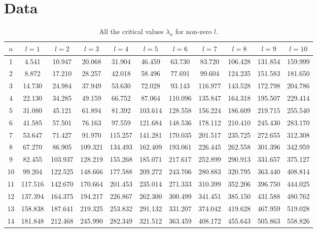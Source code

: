\documentclass[12pt,twoside]{reedthesis}
\begin{document}
\chapter{Data}
\begin{table}[h]
\begin{adjustwidth}{-0.5in}{-0.5in}
	\caption{All the critical values $\lambda_n$ for non-zero $l$.}
	\label{tab:alldata}
	\begin{tabular}{c|cccccccccc}
		$n$	& $l = 1$	& $l = 2$	& $l = 3$	& $l = 4$	& $l = 5$	& $l = 6$	& $l = 7$	& $l = 8$	& $l = 9$	& $l = 10$\\
		\hline
		1	& 4.541	& 10.947	& 20.068	& 31.904	& 46.459	& 63.730	& 83.720	& 106.428	& 131.854	& 159.999\\
		2	& 8.872	& 17.210	& 28.257	& 42.018	& 58.496	& 77.691	& 99.604	& 124.235	& 151.583	& 181.650\\
		3	& 14.730	& 24.984	& 37.949	& 53.630	& 72.028	& 93.143	& 116.977	& 143.528	& 172.798	& 204.786\\
		4	& 22.130	& 34.285	& 49.159	& 66.752	& 87.064	& 110.096	& 135.847	& 164.318	& 195.507	& 229.414\\
		5	& 31.080	& 45.121	& 61.894	& 81.392	& 103.614	& 128.558	& 156.224	& 186.609	& 219.715	& 255.540\\
		6	& 41.585	& 57.501	& 76.163	& 97.559	& 121.684	& 148.536	& 178.112	& 210.410	& 245.430	& 283.170\\
		7	& 53.647	& 71.427	& 91.970	& 115.257	& 141.281	& 170.035	& 201.517	& 235.725	& 272.655	& 312.308\\
		8	& 67.270	& 86.905	& 109.321	& 134.493	& 162.409	& 193.061	& 226.445	& 262.558	& 301.396	& 342.959\\
		9	& 82.455	& 103.937	& 128.219	& 155.268	& 185.071	& 217.617	& 252.899	& 290.913	& 331.657	& 375.127\\
		10	& 99.204	& 122.525	& 148.666	& 177.588	& 209.272	& 243.706	& 280.883	& 320.795	& 363.440	& 408.814\\
		11	& 117.516	& 142.670	& 170.664	& 201.453	& 235.014	& 271.333	& 310.399	& 352.206	& 396.750	& 444.025\\
		12	& 137.394	& 164.375	& 194.217	& 226.867	& 262.300	& 300.499	& 341.451	& 385.150	& 431.588	& 480.762\\
		13	& 158.838	& 187.641	& 219.325	& 253.832	& 291.132	& 331.207	& 374.042	& 419.628	& 467.959	& 519.028\\
		14	& 181.848	& 212.468	& 245.990	& 282.349	& 321.512	& 363.459	& 408.172	& 455.643	& 505.863	& 558.826\\

\end{tabular}
\end{adjustwidth}
\end{table}
\end{document}
